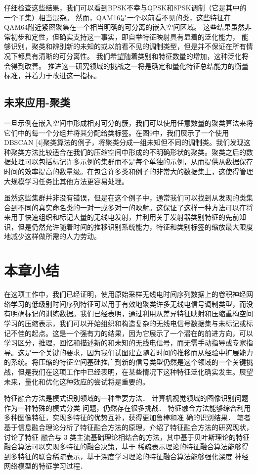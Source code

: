 仔细检查这些结果，我们可以看到BPSK不幸与QPSK和8PSK调制（它是其中的一个子集）相当混杂。
然而，QAM16是一个以前看不见的类，这些特征在QAM64附近紧密聚集在一个相当明确的可分离的嵌入空间区域。
这些结果虽然非常初步和定性，但确实支持这一事实，即自举特征映射具有显着的泛化能力，
能够识别，聚类和辨别新的未知的或以前看不见的调制类型，但是并不保证在所有情况下都具有清晰的可分离性。
我们希望随着类别和特征数量的增加，这种泛化将会得到改善。
推进这一研究领域的挑战之一将是确定和量化特征总结能力的衡量标准，并着力于改进这一指标。\par

\subsection{未来应用-聚类}
一旦示例在嵌入空间中形成相对可分的簇，我们可以使用任意数量的聚类算法来将它们中的每一个分组并将其分配给类标签。在图9中，我们展示了一个使用DBSCAN [4]聚类算法的例子，将聚类分成一组未知但不同的调制类。我们发现这种聚类方法比较适合在我们的压缩空间中形成的不明确形状的聚类。聚类之后的数据处理可以包括标记许多示例的集群而不是每个单独的示例，从而提供从数据保存时间的效率提高的数量级。在包含许多类和例子的非常大的数据集上，这使得管理大规模学习任务比其他方法更容易处理。\par
虽然这些集群并非没有错误，但是在这个例子中，通常我们可以找到从发现的类集合到不同的真实命名类的一对一或多对一的映射。这保证了这样一种方法可以在将来用于快速组织和标记大量的无线电发射，并利用关于发射器类别特征的先前知识，但是仍然允许随着时间的推移识别系统能力，特征和类别标签的缩放最大限度地减少这样做所需的人力劳动。\par


\section{本章小结}
在这项工作中，我们已经证明，使用原始采样无线电时间序列数据上的卷积神经网络学习的低级别时间序列特征可以用于有效地聚类许多无线电信号调制类型，而没有明确标记的训练数据。我们已经表明，通过利用从差异特征映射和压缩重构空间学习的压缩表示，我们可以开始组织和构造复杂的无线电信号数据集与未标记或标记不佳的起点。这是一个强有力的结果，因为它展示了一个潜在的前进方向，可以学习区分，推理，回忆和描述新的和未知的无线电信号，而无需手动指导或专家指导。这是一个关键的要求，因为我们试图建立随着时间的推移而从经验中扩展能力的系统。将压缩的特征空间基础推广到新的信号类型仍然是这个领域的一个关键挑战，但是我们在这项工作中已经表明，在某些情况下这种特征泛化确实发生。展望未来，量化和优化这种效应的尝试将是重要的。\par

特征融合方法是模式识别领域的一种重要方法． 计算机视觉领域的图像识别问题作为一种特殊的模式分类
问题，仍然存在很多挑战． 特征融合方法能够综合利用多种图像特征，实现多特征的优势互补，获得更加鲁棒和准
确的识别结果． 笔者基于信息融合理论分析了特征融合方法的原理，介绍了特征融合方法的研究现状，讨论了特征
融合与 3 类主流基础理论相结合的方法，其中基于贝叶斯理论的特征融合算法可以实现多特征的融合决策，基于
稀疏表示理论的特征融合算法能够得到多特征的联合稀疏表示，基于深度学习理论的特征融合算法能够强化深度
神经网络模型的特征学习过程．\par
